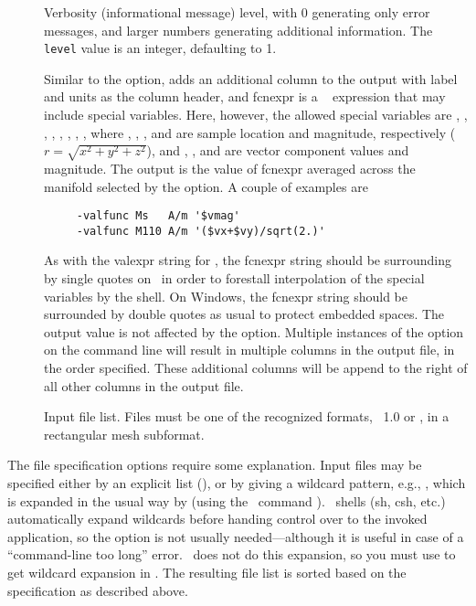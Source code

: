 \begin{description}
\item[]
  Verbosity (informational message) level, with 0 generating only
  error messages, and larger numbers generating additional information.
  The {\tt level} value is an integer, defaulting to 1.
\item[]
  Similar to the  option,  adds an additional
  column to the output with label and units as the column header, and
  fcnexpr is a \Tcl\  expression that may include special
  variables.  Here, however, the allowed special variables are
  , , , ,
  , , , , where 
  , , , and  are sample location and
  magnitude, respectively ($r = \sqrt{x^2+y^2+z^2}$), and
  , ,  and  are vector component
  values and magnitude.  The output is the value of fcnexpr averaged
  across the manifold selected by the  option.  A couple
  of examples are
  \begin{verbatim}
     -valfunc Ms   A/m '$vmag'
     -valfunc M110 A/m '($vx+$vy)/sqrt(2.)'
  \end{verbatim}
  As with the valexpr string for , the fcnexpr string
  should be surrounding by single quotes on \Unix\ in order to
  forestall interpolation of the special variables by the shell.  On
  Windows, the fcnexpr string should be surrounded by double quotes as
  usual to protect embedded spaces.
  The output value is not affected by the  option.
  Multiple instances of the
   option on the command line will result in multiple
  columns in the output file, in the order specified.  These
  additional columns will be append to the right of all other columns in
  the output file.
\item[]
  Input file list.  Files must be one of the recognized
  formats,  \OVF\ 1.0 or \VIO, in a rectangular mesh subformat.
\end{description}

The file specification options require some explanation.  Input files
may be specified either by an explicit list (),
or by giving a wildcard pattern, e.g., , which is
expanded in the usual way by  (using the \Tcl\ command
).   \Unix\ shells (sh, csh, etc.) automatically expand
wildcards before handing control over to the invoked application, so the
 option is not usually needed---although it is useful in case of a
``command-line too long'' error.  \DOS\ does not do this expansion, so
you must use  to get wildcard
expansion in \Windows.
The resulting file list is sorted  based on the 
specification as described above.

